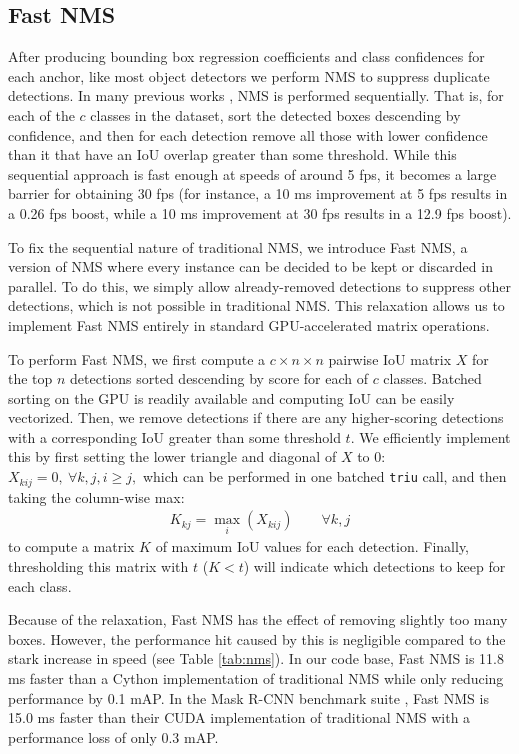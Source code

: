 \documentclass[10pt,journal,compsoc]{IEEEtran}
\begin{document}
\subsection{Fast NMS}
After producing bounding box regression coefficients and class confidences for each anchor, like most object detectors we perform NMS to suppress duplicate detections. In many previous works \cite{yolov2, yolov3, ssd, fasterrcnn, maskrcnn, retinanet}, NMS is performed sequentially. That is, for each of the $c$ classes in the dataset, sort the detected boxes descending by confidence, and then for each detection remove all those with lower confidence than it that have an IoU overlap greater than some threshold. While this sequential approach is fast enough at speeds of around 5 fps, it becomes a large barrier for obtaining 30 fps (for instance, a 10 ms improvement at 5 fps results in a 0.26 fps boost, while a 10 ms improvement at 30 fps results in a 12.9 fps boost).

To fix the sequential nature of traditional NMS, we introduce Fast NMS, a version of NMS where every instance can be decided to be kept or discarded in parallel. To do this, we simply allow already-removed detections to suppress other detections, which is not possible in traditional NMS. This relaxation allows us to implement Fast NMS entirely in standard GPU-accelerated matrix operations.


To perform Fast NMS, we first compute a $c \times n\times n$ pairwise IoU matrix $X$ for the top $n$ detections sorted descending by score for each of $c$ classes. Batched sorting on the GPU is readily available and computing IoU can be easily vectorized. Then, we remove detections if there are any higher-scoring detections with a corresponding IoU greater than some threshold $t$. We efficiently implement this by first setting the lower triangle and diagonal of $X$ to 0: $X_{kij} = 0, ~\forall k, j, i \geq j,$
which can be performed in one batched {\tt triu} call, and then taking the column-wise max:
    \begin{align} \label{eq:max}
        K_{kj} = \max_i(X_{kij}) \qquad \forall k, j
    \end{align} 
to compute a matrix $K$ of maximum IoU values for each detection. Finally, thresholding this matrix with $t$ ($K < t$) will indicate which detections to keep for each class.

Because of the relaxation, Fast NMS has the effect of removing slightly too many boxes. However, the performance hit caused by this is negligible compared to the stark increase in speed (see Table \ref{tab:nms}). In our code base, Fast NMS is 11.8 ms faster than a Cython implementation of traditional NMS while only reducing performance by 0.1 mAP. In the Mask R-CNN benchmark suite \cite{maskrcnn}, Fast NMS is 15.0 ms faster than their CUDA implementation of traditional NMS with a performance loss of only 0.3 mAP.
\end{document}
